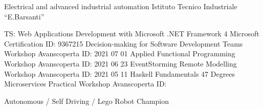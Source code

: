 \documentclass[9pt]{developercv}
\begin{document}


\begin{entrylist}
		{Electrical and advanced industrial automation}
		{Istituto Tecnico Industriale “E.Barsanti”}
		{}
\end{entrylist}



\begin{entrylist}
		{TS\@: Web Applications Development with Microsoft \@.NET Framework 4}
		{Microsoft Certification}
		{ID\@: 9367215}
		{Decision-making for Software Development Teams Workshop}
		{Avanscoperta}
		{ID\@: 2021 07 01}
		{Applied Functional Programming Workshop}
		{Avanscoperta}
		{ID\@: 2021 06 23}
		{EventStorming Remote Modelling Workshop}
		{Avanscoperta}
		{ID\@: 2021 05 11}
		{Haskell Fundamentals }
		{47 Degrees}
		{}
		{Microservices Practical Workshop}
		{Avanscoperta}
		{ID\@: }
\end{entrylist}



\begin{entrylist}
		{Autonomous / Self Driving / Lego Robot Champion}
		{}
		{}
\end{entrylist}
\end{document}
